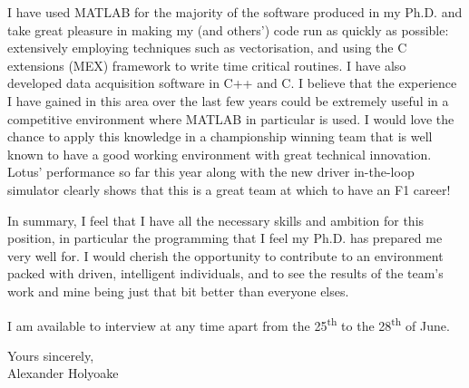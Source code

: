 \documentclass[a4paper,10pt]{article}
\begin{document}
  I have used MATLAB for the majority of the software produced in my Ph.D. and take great pleasure in making my (and others') code run as quickly as possible: extensively employing techniques such as vectorisation, and using the C extensions (MEX) framework to write time critical routines. I have also developed data acquisition software in C++ and C. I believe that the experience I have gained in this area over the last few years could be extremely useful in a competitive environment where MATLAB in particular is used. I would love the chance to apply this knowledge in a championship winning team that is well known to have a good working environment with great technical innovation. Lotus' performance so far this year along with the new driver in-the-loop simulator clearly shows that this is a great team at which to have an F1 career!

In summary, I feel that I have all the necessary skills and ambition for this position, in particular the programming that I feel my Ph.D. has prepared me very well for. I would cherish the opportunity to contribute to an environment packed with driven, intelligent individuals, and to see the results of the team's work and mine being just that bit better than everyone elses.

I am available to interview at any time apart from the 25\textsuperscript{th} to the 28\textsuperscript{th} of June.

\noindent
Yours sincerely,\\ 

Alexander Holyoake   
\end{document}
